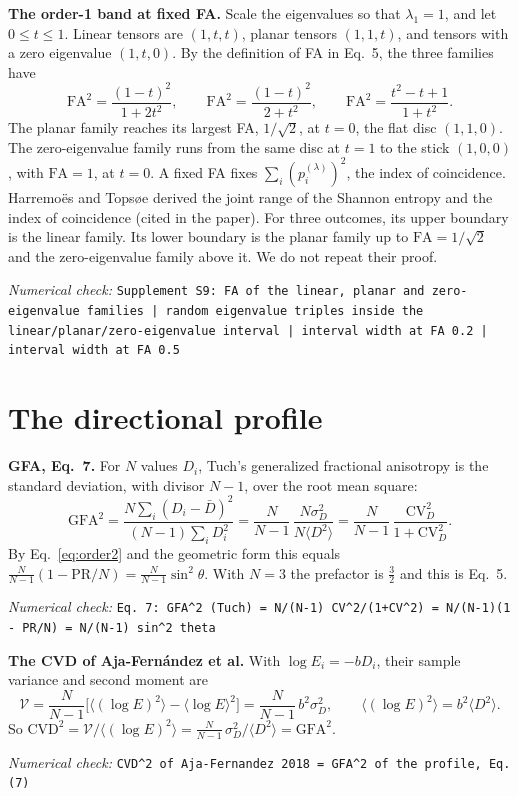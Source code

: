 \documentclass[11pt]{article}
\newcommand{\CV}{\mathrm{CV}}
\newcommand{\PR}{\mathrm{PR}}
\newcommand{\FA}{\mathrm{FA}}
\newcommand{\GFA}{\mathrm{GFA}}
\newcommand{\numcheck}[1]{\par{\small\raggedright\noindent\textit{Numerical check:} \texttt{#1}\par}}
\begin{document}
\textbf{The order-1 band at fixed FA.} Scale the eigenvalues so that $\lambda_1=1$, and let $0\le t\le1$. Linear
tensors are $(1,t,t)$, planar tensors $(1,1,t)$, and tensors with a zero eigenvalue $(1,t,0)$. By the definition of
FA in Eq.~5, the three families have
\begin{equation}
\FA^2 = \frac{(1-t)^2}{1+2t^2}, \qquad \FA^2 = \frac{(1-t)^2}{2+t^2}, \qquad \FA^2 = \frac{t^2-t+1}{1+t^2} .
\end{equation}
The planar family reaches its largest FA, $1/\sqrt2$, at $t=0$, the flat disc $(1,1,0)$. The zero-eigenvalue family
runs from the same disc at $t=1$ to the stick $(1,0,0)$, with $\FA=1$, at $t=0$. A fixed FA fixes
$\sum_i(p^{(\lambda)}_i)^2$, the index of coincidence. Harremo\"es and Tops{\o}e derived the joint range of the
Shannon entropy and the index of coincidence (cited in the paper). For three outcomes, its upper boundary is the
linear family. Its lower boundary is the planar family up to $\FA=1/\sqrt2$ and the zero-eigenvalue family above
it. We do not repeat their proof.
\numcheck{Supplement S9: FA of the linear, planar and zero-eigenvalue families | random eigenvalue triples inside the linear/planar/zero-eigenvalue interval | interval width at FA 0.2 | interval width at FA 0.5}

\section{The directional profile}

\textbf{GFA, Eq.~7.} For $N$ values $D_i$, Tuch's generalized fractional anisotropy is the standard deviation, with
divisor $N-1$, over the root mean square:
\begin{equation}
\GFA^2 = \frac{N\sum_i(D_i-\bar D)^2}{(N-1)\sum_iD_i^2} = \frac{N}{N-1}\,\frac{N\sigma_D^2}{N\langle D^2\rangle}
= \frac{N}{N-1}\,\frac{\CV_D^2}{1+\CV_D^2} .
\end{equation}
By Eq.~\eqref{eq:order2} and the geometric form this equals $\frac{N}{N-1}(1-\PR/N) = \frac{N}{N-1}\sin^2\theta$.
With $N=3$ the prefactor is $\tfrac32$ and this is Eq.~5.
\numcheck{Eq. 7: GFA\^{}2 (Tuch) = N/(N-1) CV\^{}2/(1+CV\^{}2) = N/(N-1)(1 - PR/N) = N/(N-1) sin\^{}2 theta}

\textbf{The CVD of Aja-Fern\'andez et al.} With $\log E_i = -bD_i$, their sample variance and second moment are
\begin{equation}
\mathcal V = \frac{N}{N-1}\bigl[\langle(\log E)^2\rangle - \langle\log E\rangle^2\bigr] = \frac{N}{N-1}\,b^2\sigma_D^2,
\qquad \langle(\log E)^2\rangle = b^2\langle D^2\rangle .
\end{equation}
So $\mathrm{CVD}^2 = \mathcal V/\langle(\log E)^2\rangle = \frac{N}{N-1}\,\sigma_D^2/\langle D^2\rangle = \GFA^2$.
\numcheck{CVD\^{}2 of Aja-Fernandez 2018 = GFA\^{}2 of the profile, Eq. (7)}
\end{document}
